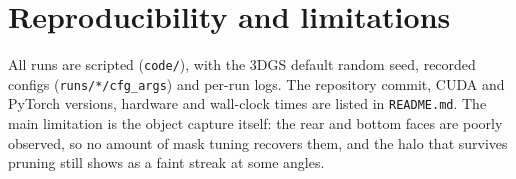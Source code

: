 \documentclass[10pt,twocolumn,letterpaper]{article}
\begin{document}
\section{Reproducibility and limitations}

All runs are scripted (\texttt{code/}), with the 3DGS default random seed, recorded configs
(\texttt{runs/*/cfg\_args}) and per-run logs. The repository commit, CUDA and PyTorch versions,
hardware and wall-clock times are listed in \texttt{README.md}. The main limitation is the object
capture itself: the rear and bottom faces are poorly observed, so no amount of mask tuning
recovers them, and the halo that survives pruning still shows as a faint streak at some angles.

\FloatBarrier


\end{document}
